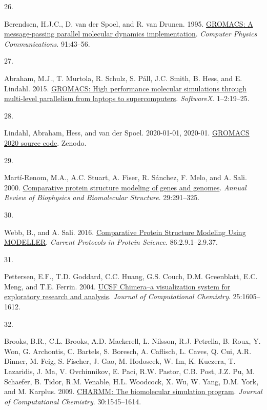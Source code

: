 \documentclass[
  letterpaper,
  DIV=11,
  numbers=noendperiod]{scrartcl}
\newlength{\cslhangindent}
\newlength{\csllabelwidth}
\newlength{\cslentryspacingunit} %
\newenvironment{CSLReferences}[2] %
 {%
  \setlength{\parindent}{0pt}
  \ifodd #1
  \let\oldpar\par
  \def\par{\hangindent=\cslhangindent\oldpar}
  \fi
  \setlength{\parskip}{#2\cslentryspacingunit}
 }%
 {}
\newcommand{\CSLLeftMargin}[1]{\parbox[t]{\csllabelwidth}{#1}}
\newcommand{\CSLRightInline}[1]{\parbox[t]{\linewidth - \csllabelwidth}{#1}\break}
\begin{document}
\begin{CSLReferences}{0}{0}
\leavevmode{}%
\CSLLeftMargin{26. }
\CSLRightInline{Berendsen, H.J.C., D. van der Spoel, and R. van Drunen.
1995. \href{https://doi.org/10.1016/0010-4655(95)00042-E}{{GROMACS}: {A}
message-passing parallel molecular dynamics implementation}.
\emph{Computer Physics Communications}. 91:43--56.}

\leavevmode{}%
\CSLLeftMargin{27. }
\CSLRightInline{Abraham, M.J., T. Murtola, R. Schulz, S. Páll, J.C.
Smith, B. Hess, and E. Lindahl. 2015.
\href{https://doi.org/10.1016/j.softx.2015.06.001}{{GROMACS}: {High}
performance molecular simulations through multi-level parallelism from
laptops to supercomputers}. \emph{SoftwareX}. 1--2:19--25.}

\leavevmode{}%
\CSLLeftMargin{28. }
\CSLRightInline{Lindahl, Abraham, Hess, and van der Spoel. 2020-01-01,
2020-01. \href{https://doi.org/10.5281/zenodo.3562495}{{GROMACS} 2020
source code}. {Zenodo}.}

\leavevmode{}%
\CSLLeftMargin{29. }
\CSLRightInline{Martí-Renom, M.A., A.C. Stuart, A. Fiser, R. Sánchez, F.
Melo, and A. Sali. 2000.
\href{https://doi.org/10.1146/annurev.biophys.29.1.291}{Comparative
protein structure modeling of genes and genomes}. \emph{Annual Review of
Biophysics and Biomolecular Structure}. 29:291--325.}

\leavevmode{}%
\CSLLeftMargin{30. }
\CSLRightInline{Webb, B., and A. Sali. 2016.
\href{https://doi.org/10.1002/cpps.20}{Comparative {Protein Structure
Modeling Using MODELLER}}. \emph{Current Protocols in Protein Science}.
86:2.9.1--2.9.37.}

\leavevmode{}%
\CSLLeftMargin{31. }
\CSLRightInline{Pettersen, E.F., T.D. Goddard, C.C. Huang, G.S. Couch,
D.M. Greenblatt, E.C. Meng, and T.E. Ferrin. 2004.
\href{https://doi.org/10.1002/jcc.20084}{{UCSF Chimera--a} visualization
system for exploratory research and analysis}. \emph{Journal of
Computational Chemistry}. 25:1605--1612.}

\leavevmode{}%
\CSLLeftMargin{32. }
\CSLRightInline{Brooks, B.R., C.L. Brooks, A.D. Mackerell, L. Nilsson,
R.J. Petrella, B. Roux, Y. Won, G. Archontis, C. Bartels, S. Boresch, A.
Caflisch, L. Caves, Q. Cui, A.R. Dinner, M. Feig, S. Fischer, J. Gao, M.
Hodoscek, W. Im, K. Kuczera, T. Lazaridis, J. Ma, V. Ovchinnikov, E.
Paci, R.W. Pastor, C.B. Post, J.Z. Pu, M. Schaefer, B. Tidor, R.M.
Venable, H.L. Woodcock, X. Wu, W. Yang, D.M. York, and M. Karplus. 2009.
\href{https://doi.org/10.1002/jcc.21287}{{CHARMM}: {The} biomolecular
simulation program}. \emph{Journal of Computational Chemistry}.
30:1545--1614.}


\end{CSLReferences}
\end{document}
